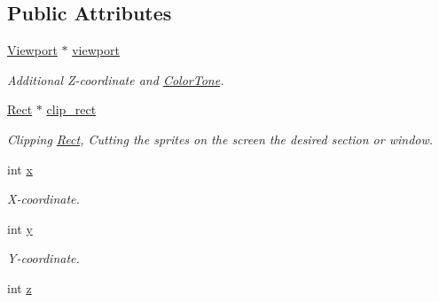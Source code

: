 \subsection*{Public Attributes}
\begin{DoxyCompactItemize}
\item 
\hypertarget{class_f2_c_1_1_array_sprite_acbf1252a3782ba0a09c14b0b52fd48b8}{
\hyperlink{class_f2_c_1_1_viewport}{Viewport} $\ast$ \hyperlink{class_f2_c_1_1_array_sprite_acbf1252a3782ba0a09c14b0b52fd48b8}{viewport}}
\label{class_f2_c_1_1_array_sprite_acbf1252a3782ba0a09c14b0b52fd48b8}

\begin{DoxyCompactList}\small\item\em Additional Z-\/coordinate and \hyperlink{class_f2_c_1_1_color_tone}{ColorTone}. \item\end{DoxyCompactList}\item 
\hypertarget{class_f2_c_1_1_array_sprite_a82f6e110d53af9dda0420cc8ef9488ef}{
\hyperlink{class_f2_c_1_1_rect}{Rect} $\ast$ \hyperlink{class_f2_c_1_1_array_sprite_a82f6e110d53af9dda0420cc8ef9488ef}{clip\_\-rect}}
\label{class_f2_c_1_1_array_sprite_a82f6e110d53af9dda0420cc8ef9488ef}

\begin{DoxyCompactList}\small\item\em Clipping \hyperlink{class_f2_c_1_1_rect}{Rect}, Cutting the sprites on the screen the desired section or window. \item\end{DoxyCompactList}\item 
\hypertarget{class_f2_c_1_1_array_sprite_a210abd1c6161772e587ba25007e6291c}{
int \hyperlink{class_f2_c_1_1_array_sprite_a210abd1c6161772e587ba25007e6291c}{x}}
\label{class_f2_c_1_1_array_sprite_a210abd1c6161772e587ba25007e6291c}

\begin{DoxyCompactList}\small\item\em X-\/coordinate. \item\end{DoxyCompactList}\item 
\hypertarget{class_f2_c_1_1_array_sprite_a7289484d1e5e4806ec6c7116464c79f8}{
int \hyperlink{class_f2_c_1_1_array_sprite_a7289484d1e5e4806ec6c7116464c79f8}{y}}
\label{class_f2_c_1_1_array_sprite_a7289484d1e5e4806ec6c7116464c79f8}

\begin{DoxyCompactList}\small\item\em Y-\/coordinate. \item\end{DoxyCompactList}\item 
\hypertarget{class_f2_c_1_1_array_sprite_a35e4fa5f409c3a8c333a992f7d0eea1c}{
int \hyperlink{class_f2_c_1_1_array_sprite_a35e4fa5f409c3a8c333a992f7d0eea1c}{z}}
\label{class_f2_c_1_1_array_sprite_a35e4fa5f409c3a8c333a992f7d0eea1c}


\end{DoxyCompactItemize}
